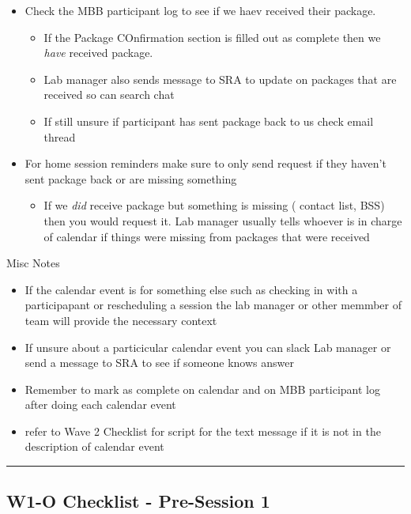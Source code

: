 \documentclass[
]{book}
\providecommand{\tightlist}{%
  \setlength{\itemsep}{0pt}\setlength{\parskip}{0pt}}
\begin{document}
\begin{itemize}
\item
  Check the MBB participant log to see if we haev received their package.

  \begin{itemize}
  \item
    If the Package COnfirmation section is filled out as complete then we \emph{have} received package.
  \item
    Lab manager also sends message to SRA to update on packages that are received so can search chat
  \item
    If still unsure if participant has sent package back to us check email thread
  \end{itemize}
\item
  For home session reminders make sure to only send request if they haven't sent package back or are missing something

  \begin{itemize}
  \tightlist
  \item
    If we \emph{did} receive package but something is missing ( contact list, BSS) then you would request it. Lab manager usually tells whoever is in charge of calendar if things were missing from packages that were received
  \end{itemize}
\end{itemize}

Misc Notes

\begin{itemize}
\item
  If the calendar event is for something else such as checking in with a participapant or rescheduling a session the lab manager or other memmber of team will provide the necessary context
\item
  If unsure about a particicular calendar event you can slack Lab manager or send a message to SRA to see if someone knows answer
\item
  Remember to mark as complete on calendar and on MBB participant log after doing each calendar event
\item
  refer to Wave 2 Checklist for script for the text message if it is not in the description of calendar event
\end{itemize}

\begin{center}\rule{0.5\linewidth}{0.5pt}\end{center}

\hypertarget{w1-o-checklist---pre-session-1}{%
\subsection{W1-O Checklist - Pre-Session 1}\label{w1-o-checklist---pre-session-1}}
\end{document}

